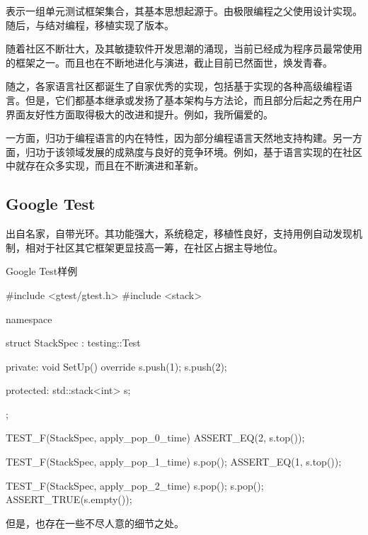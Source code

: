 \begin{content}

表示一组单元测试框架集合，其基本思想起源于。由极限编程之父使用设计实现。随后，与结对编程，移植实现了版本。

随着社区不断壮大，及其敏捷软件开发思潮的涌现，当前已经成为程序员最常使用的框架之一。而且也在不断地进化与演进，截止目前已然面世，焕发青春。

随之，各家语言社区都诞生了自家优秀的实现，包括基于实现的各种高级编程语言。但是，它们都基本继承或发扬了基本架构与方法论，而且部分后起之秀在用户界面友好性方面取得极大的改进和提升。例如，我所偏爱的。

一方面，归功于编程语言的内在特性，因为部分编程语言天然地支持构建。另一方面，归功于该领域发展的成熟度与良好的竞争环境。例如，基于\cpp{}语言实现的在社区中就存在众多实现，而且在不断演进和革新。

\subsection{Google Test}

出自名家，自带光环。其功能强大，系统稳定，移植性良好，支持用例自动发现机制，相对于社区其它框架更显技高一筹，在社区占据主导地位。

\begin{nodiff}{Google Test样例}
 \begin{c++}
#include <gtest/gtest.h>
#include <stack>

namespace {
  struct StackSpec : testing::Test {
  private:
    void SetUp() override {
      s.push(1);
      s.push(2);
    }

  protected:
    std::stack<int> s;
  };
}

TEST_F(StackSpec, apply_pop_0_time) {
  ASSERT_EQ(2, s.top());
}

TEST_F(StackSpec, apply_pop_1_time) {
  s.pop();
  ASSERT_EQ(1, s.top());
}

TEST_F(StackSpec, apply_pop_2_time) {
  s.pop();
  s.pop();
  ASSERT_TRUE(s.empty());
}
 \end{c++}
\end{nodiff}

但是，也存在一些不尽人意的细节之处。


\end{content}
